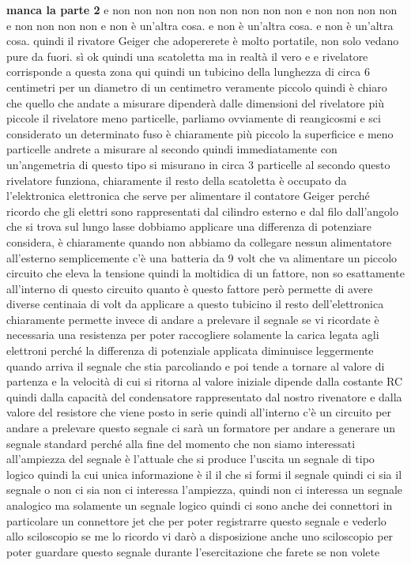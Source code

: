 {\textbf{manca la parte 2}
e non non non non non non non non non e non non non non e non non non non e non è un'altra cosa. e non è un'altra cosa. e non è un'altra cosa. quindi il rivatore Geiger che adopererete è molto portatile, non solo vedano pure da fuori. sì ok quindi una scatoletta ma in realtà il vero e e rivelatore corrisponde a questa zona qui quindi un tubicino della lunghezza di circa 6 centimetri per un diametro di un centimetro veramente piccolo quindi è chiaro che quello che andate a misurare dipenderà dalle dimensioni del rivelatore più piccole il rivelatore meno particelle, parliamo ovviamente di reangicosmi e sci considerato un determinato fuso è chiaramente più piccolo la superficice e meno particelle andrete a misurare al secondo quindi immediatamente con un'angemetria di questo tipo si misurano in circa 3 particelle al secondo questo rivelatore funziona, chiaramente il resto della scatoletta è occupato da l'elektronica elettronica che serve per alimentare il contatore Geiger perché ricordo che gli elettri sono rappresentati dal cilindro esterno e dal filo dall'angolo che si trova sul lungo lasse dobbiamo applicare una differenza di potenziare considera, è chiaramente quando non abbiamo da collegare nessun alimentatore all'esterno semplicemente c'è una batteria da 9 volt che va alimentare un piccolo circuito che eleva la tensione quindi la moltidica di un fattore, non so esattamente all'interno di questo circuito quanto è questo fattore però permette di avere diverse centinaia di volt da applicare a questo tubicino il resto dell'elettronica chiaramente permette invece di andare a prelevare il segnale se vi ricordate è necessaria una resistenza per poter raccogliere solamente la carica legata agli elettroni perché la differenza di potenziale applicata diminuisce leggermente quando arriva il segnale che stia parcoliando e poi tende a tornare al valore di partenza e la velocità di cui si ritorna al valore iniziale dipende dalla costante RC quindi dalla capacità del condensatore rappresentato dal nostro rivenatore e dalla valore del resistore che viene posto in serie quindi all'interno c'è un circuito per andare a prelevare questo segnale ci sarà un formatore per andare a generare un segnale standard perché alla fine del momento che non siamo interessati all'ampiezza del segnale è l'attuale che si produce l'uscita un segnale di tipo logico quindi la cui unica informazione è il il che si formi il segnale quindi ci sia il segnale o non ci sia non ci interessa l'ampiezza, quindi non ci interessa un segnale analogico ma solamente un segnale logico quindi ci sono anche dei connettori in particolare un connettore jet che per poter registrarre questo segnale e vederlo allo sciloscopio se me lo ricordo vi darò a disposizione anche uno sciloscopio per poter guardare questo segnale durante l'esercitazione che farete se non volete 

}
